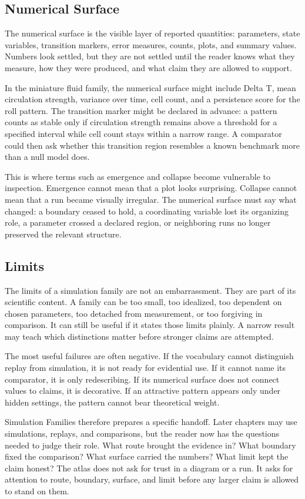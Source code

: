 \documentclass[11pt,a4paper,openany]{book}
\begin{document}
\subsection{Numerical Surface}
The numerical surface is the visible layer of reported quantities: parameters, state variables, transition markers, error measures, counts, plots, and summary values. Numbers look settled, but they are not settled until the reader knows what they measure, how they were produced, and what claim they are allowed to support. \cite{landau_stat_physics,prigogine_dissipative}\par
In the miniature fluid family, the numerical surface might include Delta T, mean circulation strength, variance over time, cell count, and a persistence score for the roll pattern. The transition marker might be declared in advance: a pattern counts as stable only if circulation strength remains above a threshold for a specified interval while cell count stays within a narrow range. A comparator could then ask whether this transition region resembles a known benchmark more than a null model does.\par
This is where terms such as emergence and collapse become vulnerable to inspection. Emergence cannot mean that a plot looks surprising. Collapse cannot mean that a run became visually irregular. The numerical surface must say what changed: a boundary ceased to hold, a coordinating variable lost its organizing role, a parameter crossed a declared region, or neighboring runs no longer preserved the relevant structure.\par
\subsection{Limits}
The limits of a simulation family are not an embarrassment. They are part of its scientific content. A family can be too small, too idealized, too dependent on chosen parameters, too detached from measurement, or too forgiving in comparison. It can still be useful if it states those limits plainly. A narrow result may teach which distinctions matter before stronger claims are attempted. \cite{landau_stat_physics,prigogine_dissipative}\par
The most useful failures are often negative. If the vocabulary cannot distinguish replay from simulation, it is not ready for evidential use. If it cannot name its comparator, it is only redescribing. If its numerical surface does not connect values to claims, it is decorative. If an attractive pattern appears only under hidden settings, the pattern cannot bear theoretical weight.\par
Simulation Families therefore prepares a specific handoff. Later chapters may use simulations, replays, and comparisons, but the reader now has the questions needed to judge their role. What route brought the evidence in? What boundary fixed the comparison? What surface carried the numbers? What limit kept the claim honest? The atlas does not ask for trust in a diagram or a run. It asks for attention to route, boundary, surface, and limit before any larger claim is allowed to stand on them.\par
\end{document}

